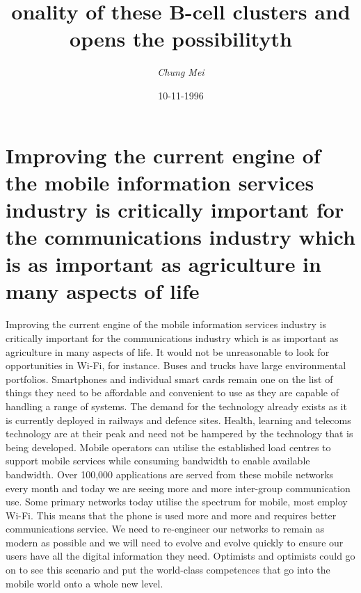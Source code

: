 \documentclass{article}%
\title{onality of these B{-}cell clusters and opens the possibilityth}%
\author{\textit{Chung Mei}}%
\date{10-11-1996}%
\begin{document}
%
\normalsize%
\maketitle%
\section{Improving the current engine of the mobile information services industry is critically important for the communications industry which is as important as agriculture in many aspects of life}%
\label{sec:Improvingthecurrentengineofthemobileinformationservicesindustryiscriticallyimportantforthecommunicationsindustrywhichisasimportantasagricultureinmanyaspectsoflife}%
Improving the current engine of the mobile information services industry is critically important for the communications industry which is as important as agriculture in many aspects of life.\newline%
It would not be unreasonable to look for opportunities in Wi{-}Fi, for instance.\newline%
Buses and trucks have large environmental portfolios. Smartphones and individual smart cards remain one on the list of things they need to be affordable and convenient to use as they are capable of handling a range of systems.\newline%
The demand for the technology already exists as it is currently deployed in railways and defence sites. Health, learning and telecoms technology are at their peak and need not be hampered by the technology that is being developed.\newline%
Mobile operators can utilise the established load centres to support mobile services while consuming bandwidth to enable available bandwidth.\newline%
Over 100,000 applications are served from these mobile networks every month and today we are seeing more and more inter{-}group communication use.\newline%
Some primary networks today utilise the spectrum for mobile, most employ Wi{-}Fi. This means that the phone is used more and more and requires better communications service.\newline%
We need to re{-}engineer our networks to remain as modern as possible and we will need to evolve and evolve quickly to ensure our users have all the digital information they need.\newline%
Optimists and optimists could go on to see this scenario and put the world{-}class competences that go into the mobile world onto a whole new level.\newline%
\end{document}
